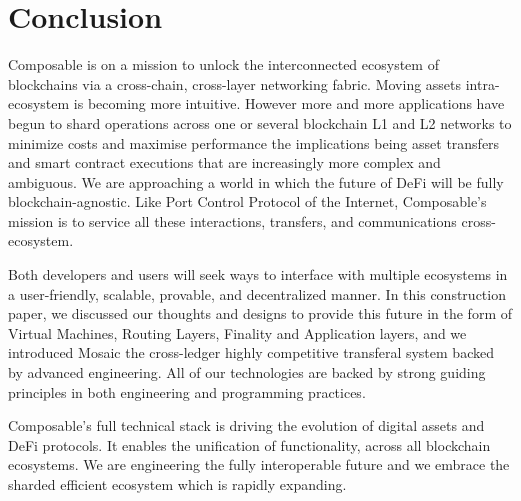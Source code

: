 \section{Conclusion}

Composable is on a mission to unlock the interconnected ecosystem of blockchains via a cross-chain, cross-layer networking fabric.
%
Moving assets intra-ecosystem is becoming more intuitive. However more and more applications have begun to shard operations across one or several blockchain L1 and L2 networks to minimize costs and maximise performance the implications being asset transfers and smart contract executions that are increasingly more complex and ambiguous. We are approaching a world in which the future of DeFi will be fully blockchain-agnostic.
%
Like Port Control Protocol of the Internet, Composable's mission is to service all these interactions, transfers, and communications cross-ecosystem.

Both developers and users will seek ways to interface with multiple ecosystems in a user-friendly, scalable, provable, and decentralized manner. In this construction paper, we discussed our thoughts and designs to provide this future in the form of Virtual Machines, Routing Layers, Finality and Application layers, and we introduced Mosaic the cross-ledger highly competitive transferal system backed by advanced engineering. All of our technologies are backed by strong guiding principles in both engineering and programming practices.

Composable's full technical stack is driving the evolution of digital assets and DeFi protocols. It enables the unification of functionality, across all blockchain ecosystems. We are engineering the fully interoperable future and we embrace the sharded efficient ecosystem which is rapidly expanding.
